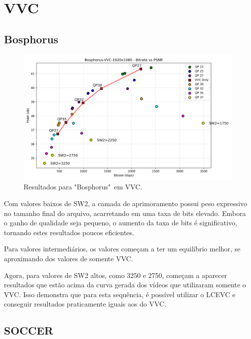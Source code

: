 \newpage

\section{VVC}

\subsection{Bosphorus}

\begin{figure}[h]
    \centering
    \includegraphics[width=1.0\textwidth]{img/Bosphorus-VVC.png}
    \caption{Resultados para "Bosphorus"\ em \acrshort{VVC}. \cite{uvg_dataset}}
    \label{fig:Bosphorus-VVC}
\end{figure}

Com valores baixos de SW2, a camada de aprimoramento possui peso expressivo no tamanho final
do arquivo, acarretando em uma taxa de bits elevado. Embora o ganho de qualidade seja pequeno, 
o aumento da taxa de bits é significativo, tornando estes resultados poucos eficientes.

Para valores intermediários, os valores começam a ter um equilíbrio melhor, se aproximando dos
valores de somente \acrshort{VVC}.

Agora, para valores de SW2 altos, como 3250 e 2750, começam a aparecer resultados que estão
acima da curva gerada dos vídeos que utilizaram somente o \acrshort{VVC}. Isso demonstra
que para esta sequência, é possível utilizar o \acrshort{LCEVC} e conseguir resultados
praticamente iguais aos do \acrshort{VVC}.

\newpage
\subsection{SOCCER}

